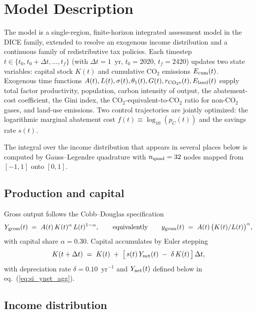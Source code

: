 \section*{Model Description}\label{si:derivation}

The model is a single-region, finite-horizon integrated assessment model in the DICE family, extended to resolve an exogenous income distribution and a continuous family of redistributive tax policies.  Each timestep $t \in \{t_0, t_0 + \Delta t, \ldots, t_f\}$ (with $\Delta t = 1$~yr, $t_0 = 2020$, $t_f = 2420$) updates two state variables: capital stock $K(t)$ and cumulative CO$_2$ emissions $E_{\rm cum}(t)$.  Exogenous time functions $A(t), L(t), \sigma(t), \theta_1(t), G(t), r_{\rm CO_2e}(t), E_{\rm land}(t)$ supply total factor productivity, population, carbon intensity of output, the abatement-cost coefficient, the Gini index, the CO$_2$-equivalent-to-CO$_2$ ratio for non-CO$_2$ gases, and land-use emissions.  Two control trajectories are jointly optimized: the logarithmic marginal abatement cost $f(t) \equiv \log_{10}(p_C(t))$ and the savings rate $s(t)$.

The integral over the income distribution that appears in several places below is computed by Gauss--Legendre quadrature with $n_{\rm quad} = 32$ nodes mapped from $[-1,1]$ onto $[0,1]$.

\subsection*{Production and capital}\label{si:economic}

Gross output follows the Cobb--Douglas specification
\begin{equation}\label{eq:si_production}
Y_{\rm gross}(t) \;=\; A(t)\, K(t)^{\alpha}\, L(t)^{1-\alpha},
\qquad \text{equivalently}\qquad
y_{\rm gross}(t) \;=\; A(t)\, \bigl(K(t)/L(t)\bigr)^{\alpha}, %
\end{equation}
with capital share $\alpha = 0.30$.  Capital accumulates by Euler stepping
\begin{equation}\label{eq:si_capital}
K(t + \Delta t) \;=\; K(t) \;+\; \bigl[\, s(t)\, Y_{\rm net}(t) \;-\; \delta\, K(t) \,\bigr]\, \Delta t, %
\end{equation}
with depreciation rate $\delta = 0.10$~yr$^{-1}$ and $Y_{\rm net}(t)$ defined below in eq.~(\ref{eq:si_ynet_agg}).

\subsection*{Income distribution}\label{si:lorenz}


